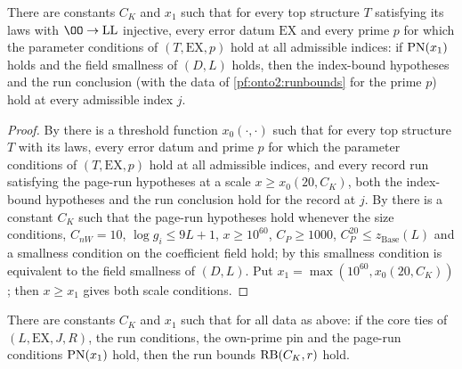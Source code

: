 \begin{lemma}\label{pf:onto2:hypconcl}
There are constants $C_K$ and $x_1$ such that for every top structure $T$ satisfying its laws with $\OO\to\mathrm{LL}$ injective,
every error datum $\mathrm{EX}$ and every prime $p$ for which the parameter conditions of $(T,\mathrm{EX},p)$ hold at all
admissible indices: if
$\mathrm{PN}(x_1)$ holds and the field smallness of $(D,L)$ holds, then the index-bound hypotheses and the run conclusion (with
the data of \cref{pf:onto2:runbounds} for the prime $p$) hold at every admissible index $j$.
\end{lemma}

\begin{proof}
By  there is a threshold function $x_0(\cdot,\cdot)$ such that for every top
structure $T$ with its laws, every error datum and prime $p$ for which the parameter conditions of $(T,\mathrm{EX},p)$ hold at all
admissible indices, and every record run satisfying the page-run hypotheses at a scale $x\ge x_0(20,C_K)$, both the
index-bound hypotheses and the run conclusion hold for the record at $j$. By
 there is a constant $C_K$ such that the page-run
hypotheses hold whenever the size conditions, $C_{nW}=10$, $\log g_i\le9L+1$, $x\ge10^{60}$, $C_P\ge1000$, $C_P^{20}\le
z_{\mathrm{Base}}(L)$ and a smallness condition on the coefficient field hold; by
 this smallness condition is equivalent to the field smallness of $(D,L)$.
Put $x_1=\max(10^{60},x_0(20,C_K))$; then $x\ge x_1$ gives both scale conditions.
\end{proof}

\begin{proposition}\label{pf:onto2:runshold}
There are constants $C_K$ and $x_1$ such that for all data as above: if the core ties of $(L,\mathrm{EX},J,R)$, the run
conditions, the own-prime pin and the page-run conditions $\mathrm{PN}(x_1)$ hold, then the run bounds $\mathrm{RB}(C_K,r)$ hold.
\end{proposition}

